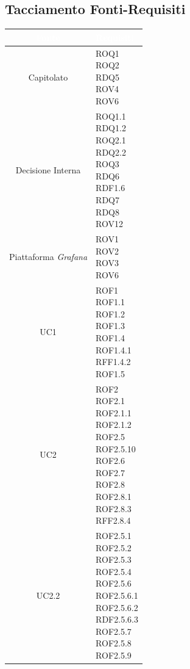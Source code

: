 \subsection{Tacciamento Fonti-Requisiti}\label{Tracciamento}
\begin{center}
\begin{longtable}[c]{|c|m{}|}
\hline
\rowcolor{bluelogo}\textbf{\textcolor{white}{Fonte}} & \textbf{\textcolor{white}{Requisiti}}\\
\hline \hline
\endhead
Capitolato & \makecell{ROQ1\\ROQ2\\RDQ5\\ROV4\\ROV6}\\
\hline
\rowcolor{grigio}Decisione Interna & \makecell{ROQ1.1\\RDQ1.2\\ROQ2.1\\RDQ2.2\\ROQ3\\RDQ6\\RDF1.6\\RDQ7\\RDQ8\\ROV12}\\
\hline
Piattaforma \textit{Grafana} & \makecell{ROV1\\ROV2\\ROV3\\ROV6}\\
\hline
\rowcolor{grigio}UC1 & \makecell{ROF1\\ROF1.1\\ROF1.2\\ROF1.3\\ROF1.4\\ROF1.4.1\\RFF1.4.2\\ROF1.5}\\
\hline
UC2 & \makecell{ROF2\\ROF2.1\\ROF2.1.1\\ROF2.1.2\\ROF2.5\\ROF2.5.10\\ROF2.6\\ROF2.7\\ROF2.8\\ROF2.8.1\\ROF2.8.3\\RFF2.8.4}\\
\hline
\rowcolor{grigio}UC2.2 & \makecell{ROF2.5.1\\ROF2.5.2\\ROF2.5.3\\ROF2.5.4\\ROF2.5.6\\ROF2.5.6.1\\ROF2.5.6.2\\RDF2.5.6.3\\ROF2.5.7\\ROF2.5.8\\ROF2.5.9}\\

\end{longtable}
\end{center}
